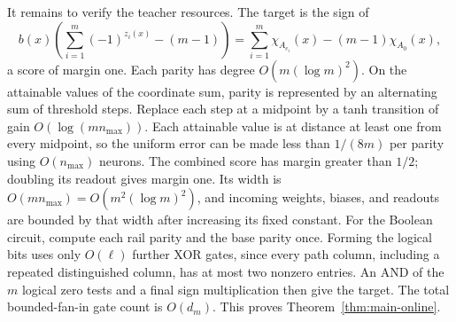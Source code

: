 \documentclass[11pt]{article}
\theoremstyle{remark}\newtheorem{remark}[theorem]{Remark}
\begin{document}
It remains to verify the teacher resources. The target is the sign of
\[
 b(x)\left(\sum_{i=1}^m(-1)^{z_i(x)}-(m-1)\right)
 =\sum_{i=1}^m\chi_{A_{e_i}}(x)-(m-1)\chi_{A_0}(x),
\]
a score of margin one. Each parity has degree $O(m(\log m)^2)$.
On the attainable values of the coordinate sum, parity is represented
by an alternating sum of threshold steps. Replace each step at a
midpoint by a tanh transition of gain $O(\log(mn_{\max}))$.
Each attainable value is at distance at least one from every midpoint,
so the uniform error can be made less than $1/(8m)$ per parity using
$O(n_{\max})$ neurons. The combined score has margin greater than
$1/2$; doubling its readout gives margin one. Its width is
$O(mn_{\max})=O(m^2(\log m)^2)$, and incoming weights, biases, and readouts
are bounded by that width after increasing its fixed constant.
For the Boolean circuit, compute each rail parity and the base parity
once. Forming the logical bits uses only $O(\ell)$ further XOR gates,
since every path column, including a repeated distinguished column,
has at most two nonzero entries. An AND of
the $m$ logical zero tests and a final sign multiplication then give
the target. The total bounded-fan-in gate count is $O(d_m)$.
This proves Theorem~\ref{thm:main-online}.

\appendix








\end{document}
